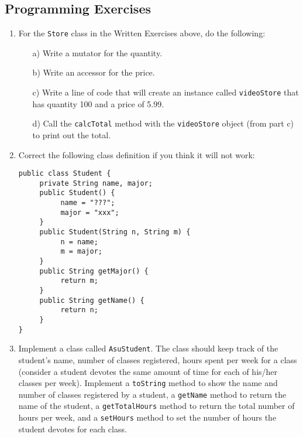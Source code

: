 \subsection{Programming Exercises}

\setcounter{counter}{1}
\begin{enumerate}[label={\arabic{counter}\addtocounter{counter}{1}}.]\bfseries

\item For the \verb|Store| class in the Written Exercises above, do the following:
\begin{enumerate}
\item[a)]Write a mutator for the quantity.
\item[b)]Write an accessor for the price.
\item[c)]Write a line of code that will create an instance called \verb|videoStore| that has quantity 100 and a price of 5.99.
\item[d)]Call the \verb|calcTotal| method with the \verb|videoStore| object (from part c) to print out the total.
\end{enumerate}

\item Correct the following class definition if you think it will not work:
\begin{lstlisting}
public class Student {
     private String name, major;
     public Student() {
          name = "???";
          major = "xxx";
     }
     public Student(String n, String m) {
          n = name;
          m = major;
     }
     public String getMajor() {
          return m;
     }
     public String getName() {
          return n;
     }
}
\end{lstlisting}

\item Implement a class called \verb|AsuStudent|. The class should keep track of the student's name, number of classes registered, hours spent per week for a class (consider a student devotes the same amount of time for each of his/her classes per week). Implement a \verb|toString| method to show the name and number of classes registered by a student, a \verb|getName| method to return the name of the student, a \verb|getTotalHours| method to return the total number of hours per week, and a \verb|setHours| method to set the number of hours the student devotes for each class.

\end{enumerate}